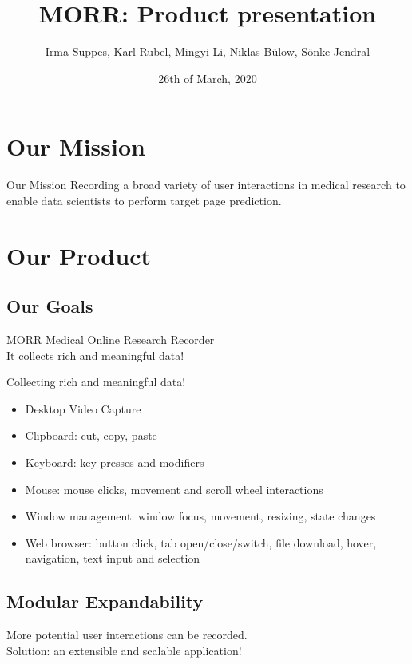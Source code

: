 \documentclass[aspectratio=169]{beamer}
\title{MORR: Product presentation}
\author{Irma Suppes, Karl Rubel, Mingyi Li, Niklas Bülow, Sönke Jendral}
\date{26th of March, 2020}
\institute{KIT / Teco}
\begin{document}
  \maketitle

  \section{Our Mission}

  \begin{frame}{Our Mission}
  	Recording a broad variety of user interactions in medical research to enable data scientists to perform target page prediction.
  \end{frame}

  \section{Our Product}
  
   \subsection{Our Goals}
   
   \begin{frame}{MORR}
       Medical Online Research Recorder\\
       It collects rich and meaningful data!
   \end{frame}
   
   \begin{frame}{Collecting rich and meaningful data!}
        \begin{itemize}
            \item Desktop Video Capture
            \item Clipboard: cut, copy, paste
            \item Keyboard: key presses and modifiers
            \item Mouse: mouse clicks, movement and scroll wheel interactions
            \item Window management: window focus, movement, resizing, state changes
            \item Web browser: button click, tab open/close/switch, file download, hover, navigation, text input and selection
        \end{itemize}
   \end{frame}
   
   \subsection{Modular Expandability}
   \begin{frame}
        More potential user interactions can be recorded.\\
       Solution: an extensible and scalable application!
   \end{frame}
   
\end{document}
